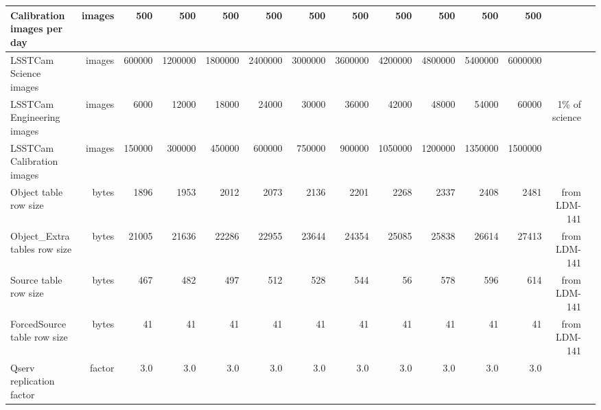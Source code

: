 \begin{longtable} { |p{}  |r  |r  |r  |r  |r  |r  |r  |r  |r  |r  |r  |r  |r |}
{Calibration images per day}&{images}&{500}&{500}&{500}&{500}&{500}&{500}&{500}&{500}&{500}&{500}& \\ \hline
{LSSTCam Science images}&{images}&{600000}&{1200000}&{1800000}&{2400000}&{3000000}&{3600000}&{4200000}&{4800000}&{5400000}&{6000000}& \\ \hline
{LSSTCam Engineering images}&{images}&{6000}&{12000}&{18000}&{24000}&{30000}&{36000}&{42000}&{48000}&{54000}&{60000}&{1\% of science} \\ \hline
{LSSTCam Calibration images}&{images}&{150000}&{300000}&{450000}&{600000}&{750000}&{900000}&{1050000}&{1200000}&{1350000}&{1500000}& \\ \hline
{Object table row size}&{bytes}&{1896}&{1953}&{2012}&{2073}&{2136}&{2201}&{2268}&{2337}&{2408}&{2481}&{from LDM-141} \\ \hline
{Object\_Extra tables row size}&{bytes}&{21005}&{21636}&{22286}&{22955}&{23644}&{24354}&{25085}&{25838}&{26614}&{27413}&{from LDM-141} \\ \hline
{Source table row size}&{bytes}&{467}&{482}&{497}&{512}&{528}&{544}&{56}&{578}&{596}&{614}&{from LDM-141} \\ \hline
{ForcedSource table row size}&{bytes}&{41}&{41}&{41}&{41}&{41}&{41}&{41}&{41}&{41}&{41}&{from LDM-141} \\ \hline
{Qserv replication factor}&{factor}&{3.0}&{3.0}&{3.0}&{3.0}&{3.0}&{3.0}&{3.0}&{3.0}&{3.0}&{3.0}& \\ \hline
\end{longtable} \normalsize
